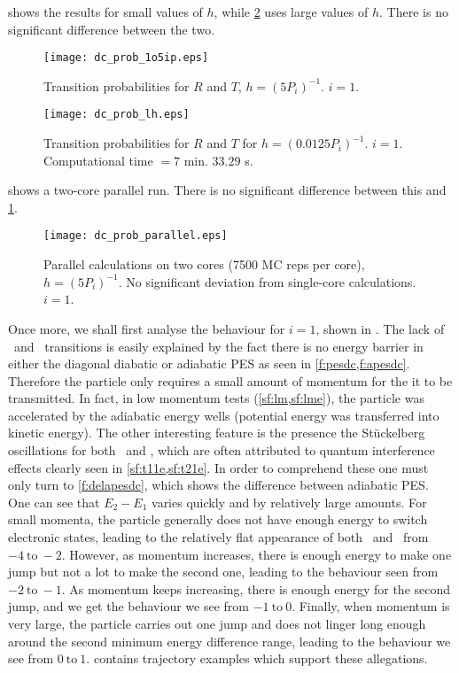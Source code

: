  shows the results for small values of $ h $, while \cref{f:dclh} uses large values of $ h $. There is no significant difference between the two.
\begin{figure}
\centering
\texttt{[image: dc\_prob\_1o5ip.eps]}
\caption[Double avoided crossing: small integration step. $ i = 1 $.]{Transition probabilities for $ R $ and $ T $, $ h =(5 P_{i})^{-1} $. $ i = 1 $.}
\label{f:dc1}
\end{figure}
\begin{figure}
\centering
\texttt{[image: dc\_prob\_lh.eps]}
\caption[Double avoided crossing: large integration step. $ i = 1 $.]{Transition probabilities for $ R $ and $ T $ for $ h = (0.0125P_{i})^{-1} $. $ i = 1 $. Computational time $ = 7$ min. $ 33.29 $ s.}
\label{f:dclh}
\end{figure}
 shows a two-core parallel run. There is no significant difference between this and \cref{f:dc1}.
\begin{figure}
\centering
\texttt{[image: dc\_prob\_parallel.eps]}
\caption[Double avoided crossing: parallel calculations. $ i = 1 $.]{Parallel calculations on two cores (7500 MC reps per core), $ h = (5P_{i})^{-1} $. No significant deviation from single-core calculations. $ i = 1 $.}
\label{f:dcpar}
\end{figure}

Once more, we shall first analyse the behaviour for $ i = 1 $, shown in . The lack of \roo~and \rto~transitions is easily explained by the fact there is no energy barrier in either the diagonal diabatic or adiabatic PES as seen in \cref{f:pesdc,f:apesdc}. Therefore the particle only requires a small amount of momentum for the it to be transmitted. In fact, in low momentum tests (\cref{sf:lm,sf:lme}), the particle was accelerated by the adiabatic energy wells (potential energy was transferred into kinetic energy). The other interesting feature is the presence the Stückelberg oscillations for both \too~and \tto, which are often attributed to quantum interference effects clearly seen in \cref{sf:t11e,sf:t21e}. In order to comprehend these one must only turn to \cref{f:delapesdc}, which shows the difference between adiabatic PES. One can see that $ E_{2} - E_{1} $ varies quickly and by relatively large amounts. For small momenta, the particle generally does not have enough energy to switch electronic states, leading to the relatively flat appearance of both \too~and \tto~from $ -4~\text{to}~-2 $. However, as momentum increases, there is enough energy to make one jump but not a lot to make the second one, leading to the behaviour seen from $ -2~\text{to}~-1 $. As momentum keeps increasing, there is enough energy for the second jump, and we get the behaviour we see from $ -1~\text{to}~0 $. Finally, when momentum is very large, the particle carries out one jump and does not linger long enough around the second minimum energy difference range, leading to the behaviour we see from $ 0~\text{to}~1 $.  contains trajectory examples which support these allegations.

